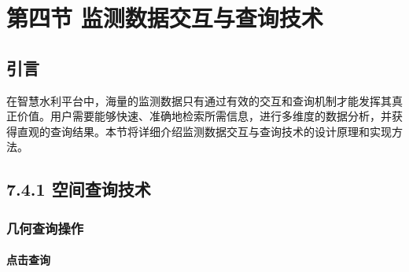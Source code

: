 \section{第四节
监测数据交互与查询技术}\label{ux7b2cux56dbux8282-ux76d1ux6d4bux6570ux636eux4ea4ux4e92ux4e0eux67e5ux8be2ux6280ux672f}

\subsection{引言}\label{ux5f15ux8a00}

在智慧水利平台中，海量的监测数据只有通过有效的交互和查询机制才能发挥其真正价值。用户需要能够快速、准确地检索所需信息，进行多维度的数据分析，并获得直观的查询结果。本节将详细介绍监测数据交互与查询技术的设计原理和实现方法。

\subsection{7.4.1
空间查询技术}\label{ux7a7aux95f4ux67e5ux8be2ux6280ux672f}

\subsubsection{几何查询操作}\label{ux51e0ux4f55ux67e5ux8be2ux64cdux4f5c}

\paragraph{点击查询}\label{ux70b9ux51fbux67e5ux8be2}

